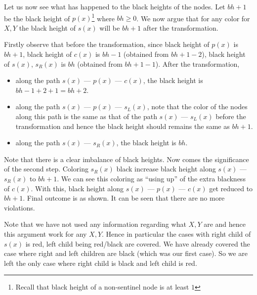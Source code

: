 \documentclass[10pt]{article}
\newcommand{\node}{\texttt{node}}
\begin{document}
Let us now see what has happened to the black heights of the nodes. Let $bh+1$
be the black height of $p(x)$\footnote{Recall that black height of a
non-sentinel node is at least $1$} where $bh \ge 0$.  We now argue that for
any color for $X, Y$ the black height of $s(x)$ will be $bh+1$ after the
transformation.

Firstly observe that before the transformation, since black height of $p(x)$
is $bh+1$, black height of $c(x)$ is $bh-1$ (obtained from $bh+1 - 2$), black
height of $s(x)$, $s_R(x)$ is $bh$ (obtained from $bh+1 - 1$). After the transformation,
\begin{itemize}
	\item along the path $s(x)$ --- $p(x)$ --- $c(x)$, the black height is
		$bh - 1+2+1 = bh+2$. 
	\item along the path $s(x)$ --- $p(x)$ --- $s_L(x)$, note that the color
		of the nodes along this path is the same as that of the path
		$s(x)$ --- $s_L(x)$ before the transformation and hence 
		the black height should remains the same as $bh+1$.
	\item along the path $s(x)$ --- $s_R(x)$, the black height is $bh$.
\end{itemize}

Note that there is a clear imbalance of black heights. Now comes the
significance of the second step. Coloring $s_R(x)$ black increase
black height along $s(x)$ --- $s_R(x)$ to $bh+1$. We can see this coloring as
``using up'' of the extra blackness of $c(x)$. With this, black height along
$s(x)$ --- $p(x)$ --- $c(x)$ get reduced to $bh+1$. Final outcome is as shown.
It can be seen that there are no more violations. 
\begin{center}
\end{center}

Note that we have not used any information regarding what $X, Y$ are and hence
this argument work for any $X, Y$. Hence in particular the cases with right
child of $s(x)$ is red, left child being red/black are covered. We have
already covered the case where right and left children are black (which was
our first case). So we are left the only case where right child is black and
left child is red.
\end{document}
